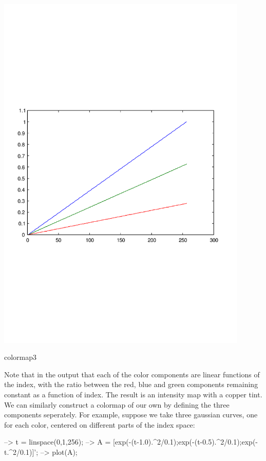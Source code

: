  
\begin{DoxyImage}
\includegraphics[width=12cm]{colormap3}
\caption{colormap3}
\end{DoxyImage}


Note that in the output that each of the color components are linear functions of the index, with the ratio between the red, blue and green components remaining constant as a function of index. The result is an intensity map with a copper tint. We can similarly construct a colormap of our own by defining the three components seperately. For example, suppose we take three gaussian curves, one for each color, centered on different parts of the index space\-:


\begin{DoxyVerbInclude}
--> t = linspace(0,1,256);
--> A = [exp(-(t-1.0).^2/0.1);exp(-(t-0.5).^2/0.1);exp(-t.^2/0.1)]';
--> plot(A);
\end{DoxyVerbInclude}


